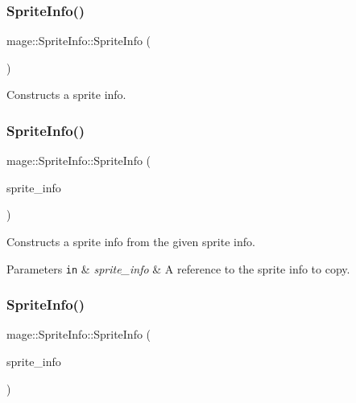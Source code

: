 \subsubsection{\texorpdfstring{Sprite\+Info()}{SpriteInfo()}\hspace{0.1cm}{\footnotesize\ttfamily [1/3]}}
{\footnotesize\ttfamily mage\+::\+Sprite\+Info\+::\+Sprite\+Info (\begin{DoxyParamCaption}{ }\end{DoxyParamCaption})}

Constructs a sprite info. \hypertarget{structmage_1_1_sprite_info_a42bf55280335f8bc91b614145f766f51}{}\label{structmage_1_1_sprite_info_a42bf55280335f8bc91b614145f766f51} 
\subsubsection{\texorpdfstring{Sprite\+Info()}{SpriteInfo()}\hspace{0.1cm}{\footnotesize\ttfamily [2/3]}}
{\footnotesize\ttfamily mage\+::\+Sprite\+Info\+::\+Sprite\+Info (\begin{DoxyParamCaption}\item[{const \hyperlink{structmage_1_1_sprite_info}{Sprite\+Info} \&}]{sprite\+\_\+info }\end{DoxyParamCaption})\hspace{0.3cm}{\ttfamily [default]}}

Constructs a sprite info from the given sprite info.


\begin{DoxyParams}[1]{Parameters}
\mbox{\tt in}  & {\em sprite\+\_\+info} & A reference to the sprite info to copy. \\
\hline
\end{DoxyParams}
\hypertarget{structmage_1_1_sprite_info_ab1aaf7a0a3f3723b0836dd6e9ec6bc3e}{}\label{structmage_1_1_sprite_info_ab1aaf7a0a3f3723b0836dd6e9ec6bc3e} 
\subsubsection{\texorpdfstring{Sprite\+Info()}{SpriteInfo()}\hspace{0.1cm}{\footnotesize\ttfamily [3/3]}}
{\footnotesize\ttfamily mage\+::\+Sprite\+Info\+::\+Sprite\+Info (\begin{DoxyParamCaption}\item[{\hyperlink{structmage_1_1_sprite_info}{Sprite\+Info} \&\&}]{sprite\+\_\+info }\end{DoxyParamCaption})\hspace{0.3cm}{\ttfamily [default]}}

